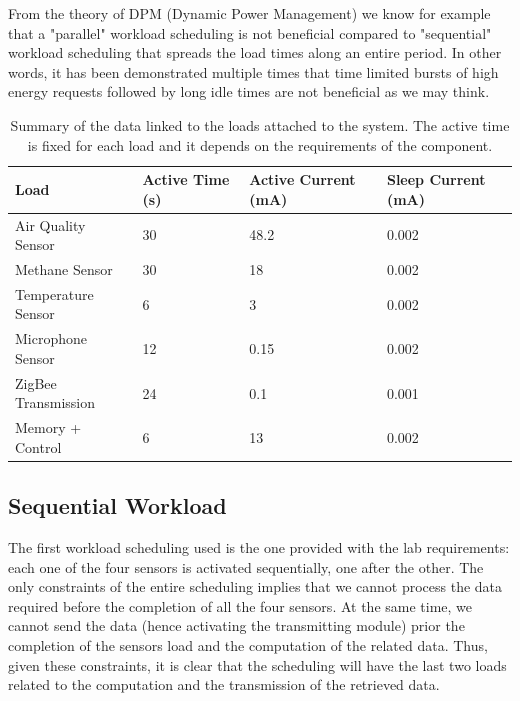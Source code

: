 \documentclass[a4paper]{article}
\begin{document}
    From the theory of DPM (Dynamic Power Management) we know for example that a "parallel" workload scheduling is not beneficial compared to "sequential" workload scheduling that spreads the load times along an entire period. In other words, it has been demonstrated multiple times that time limited bursts of high energy requests followed by long idle times are not beneficial as we may think.

    \begin{table}[]
        \centering
        \begin{tabular}{@{}llll@{}}
        \toprule
        Load                & Active Time (s) & Active Current (mA) & Sleep Current (mA) \\ \midrule
        Air Quality Sensor  & 30              & 48.2                & 0.002              \\
        Methane Sensor      & 30              & 18                  & 0.002              \\
        Temperature Sensor  & 6               & 3                   & 0.002              \\
        Microphone Sensor   & 12              & 0.15                & 0.002              \\
        ZigBee Transmission & 24              & 0.1                 & 0.001              \\
        Memory + Control    & 6               & 13                  & 0.002              \\ \bottomrule
        \end{tabular}
        \caption{Summary of the data linked to the loads attached to the system. The active time is fixed for each load and it depends on the requirements of the component.}
        \label{tab:LoadSummary}
    \end{table}

    \subsection{Sequential Workload}
        The first workload scheduling used is the one provided with the lab requirements: each one of the four sensors is activated sequentially, one after the other. The only constraints of the entire scheduling implies that we cannot process the data required before the completion of all the four sensors. At the same time, we cannot send the data (hence activating the transmitting module) prior the completion of the sensors load and the computation of the related data. 
        Thus, given these constraints, it is clear that the scheduling will have the last two loads related to the computation and the transmission of the retrieved data.
\end{document}

